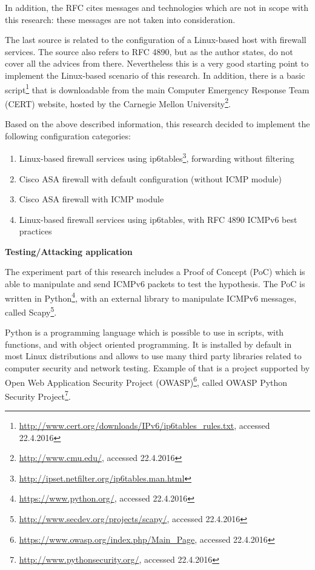 \documentclass[12pt]{article}
\begin{document}
In addition, the RFC cites messages and technologies which are not in scope with this research: these messages are not taken into consideration.

The last source is related to the configuration of a Linux-based host with firewall services. The source also refers to RFC 4890, but as the author states, do not cover all the advices from there. Nevertheless this is a very good starting point to implement the Linux-based scenario of this research\cite{ip6tablesGiobbi}. In addition, there is a basic script\footnote{\url{http://www.cert.org/downloads/IPv6/ip6tables_rules.txt}, accessed 22.4.2016} that is downloadable from the main Computer Emergency Response Team (CERT) website, hosted by the Carnegie Mellon University\footnote{\url{http://www.cmu.edu/}, accessed 22.4.2016}. 

Based on the above described information, this research decided to implement the following configuration categories:
\vspace{-10pt}
\begin{enumerate}[noitemsep,topsep=0pt,partopsep=0pt]
 \label{confCategories}
 \item Linux-based firewall services using ip6tables\footnote{\url{http://ipset.netfilter.org/ip6tables.man.html}}, forwarding without filtering
 \item Cisco ASA firewall with default configuration (without ICMP module)
 \item Cisco ASA firewall with ICMP module
 \item Linux-based firewall services using ip6tables, with RFC 4890 ICMPv6 best practices
\end{enumerate}


\textbf{Testing/Attacking application}
\label{subsub:framework}

The experiment part of this research includes a Proof of Concept (PoC) which is able to manipulate and send ICMPv6 packets to test the hypothesis. The PoC is written in Python\footnote{\url{https://www.python.org/}, accessed 22.4.2016}, with an external library to manipulate ICMPv6 messages, called Scapy\footnote{\url{http://www.secdev.org/projects/scapy/}, accessed 22.4.2016}.

Python is a programming language which is possible to use in scripts, with functions, and with object oriented programming. It is installed by default in most Linux distributions and allows to use many third party libraries related to computer security and network testing. Example of that is a project supported by Open Web Application Security Project (OWASP)\footnote{\url{https://www.owasp.org/index.php/Main_Page}, accessed 22.4.2016}, called OWASP Python Security Project\footnote{\url{http://www.pythonsecurity.org/}, accessed 22.4.2016}.
\end{document}

